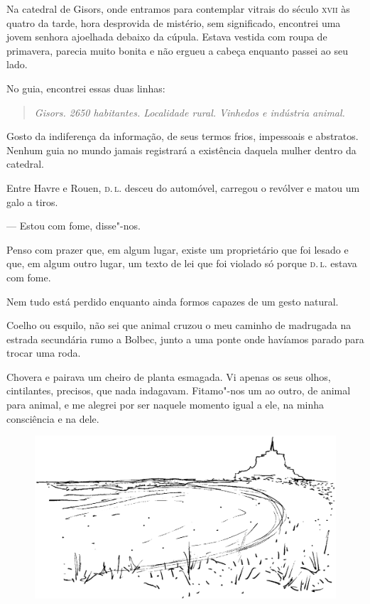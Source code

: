 \asterisc

Na catedral de Gisors, onde entramos para contemplar vitrais do
século \textsc{xvii} às quatro da tarde, hora desprovida de mistério, sem
significado, encontrei uma jovem senhora ajoelhada debaixo da
cúpula. Estava vestida com roupa de primavera, parecia muito bonita e
não ergueu a cabeça enquanto passei ao seu lado.

No guia, encontrei essas duas linhas:

\begin{quote}
\textit{Gisors. 2650 habitantes. Localidade rural. Vinhedos e indústria
animal.}
\end{quote}

Gosto da indiferença da informação, de seus termos frios, impessoais e
abstratos. Nenhum guia no mundo jamais registrará a existência daquela
mulher dentro da catedral.

\asterisc

Entre Havre e Rouen, \textsc{d.\,l.} desceu do automóvel, carregou o revólver e
matou um galo a tiros.

--- Estou com fome, disse"-nos.

Penso com prazer que, em algum lugar, existe um proprietário que foi
lesado e que, em algum outro lugar, um texto de lei que foi violado só
porque \textsc{d.\,l.} estava com fome.

Nem tudo está perdido enquanto ainda formos capazes de um gesto natural.

\asterisc

Coelho ou esquilo, não sei que animal cruzou o meu caminho de
madrugada na estrada secundária rumo a Bolbec, junto a uma ponte onde
havíamos parado para trocar uma roda.

Chovera e pairava um cheiro de planta esmagada. Vi apenas os seus
olhos, cintilantes, precisos, que nada indagavam. Fitamo"-nos um ao
outro, de animal para animal, e me alegrei por ser naquele momento
igual a ele, na minha consciência e na dele.


\pagebreak
\thispagestyle{empty}
\movetoevenpage
\thispagestyle{empty}

\begin{vplace}
\begin{figure}[h]
\includegraphics[width=\textwidth]{./imgs/praia1.png}
\end{figure}
\end{vplace}


